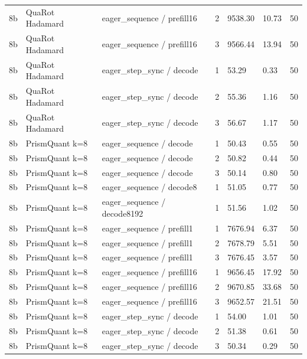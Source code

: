 {\begin{longtable}{lllllll}
8b & QuaRot Hadamard & eager\_sequence / prefill16 & 2 & 9538.30 & 10.73 & 50 \\
8b & QuaRot Hadamard & eager\_sequence / prefill16 & 3 & 9566.44 & 13.94 & 50 \\
8b & QuaRot Hadamard & eager\_step\_sync / decode & 1 & 53.29 & 0.33 & 50 \\
8b & QuaRot Hadamard & eager\_step\_sync / decode & 2 & 55.36 & 1.16 & 50 \\
8b & QuaRot Hadamard & eager\_step\_sync / decode & 3 & 56.67 & 1.17 & 50 \\
8b & PrismQuant k=8 & eager\_sequence / decode & 1 & 50.43 & 0.55 & 50 \\
8b & PrismQuant k=8 & eager\_sequence / decode & 2 & 50.82 & 0.44 & 50 \\
8b & PrismQuant k=8 & eager\_sequence / decode & 3 & 50.14 & 0.80 & 50 \\
8b & PrismQuant k=8 & eager\_sequence / decode8 & 1 & 51.05 & 0.77 & 50 \\
8b & PrismQuant k=8 & eager\_sequence / decode8192 & 1 & 51.56 & 1.02 & 50 \\
8b & PrismQuant k=8 & eager\_sequence / prefill1 & 1 & 7676.94 & 6.37 & 50 \\
8b & PrismQuant k=8 & eager\_sequence / prefill1 & 2 & 7678.79 & 5.51 & 50 \\
8b & PrismQuant k=8 & eager\_sequence / prefill1 & 3 & 7676.45 & 3.57 & 50 \\
8b & PrismQuant k=8 & eager\_sequence / prefill16 & 1 & 9656.45 & 17.92 & 50 \\
8b & PrismQuant k=8 & eager\_sequence / prefill16 & 2 & 9670.85 & 33.68 & 50 \\
8b & PrismQuant k=8 & eager\_sequence / prefill16 & 3 & 9652.57 & 21.51 & 50 \\
8b & PrismQuant k=8 & eager\_step\_sync / decode & 1 & 54.00 & 1.01 & 50 \\
8b & PrismQuant k=8 & eager\_step\_sync / decode & 2 & 51.38 & 0.61 & 50 \\
8b & PrismQuant k=8 & eager\_step\_sync / decode & 3 & 50.34 & 0.29 & 50 \\
\bottomrule
\end{longtable}
}
